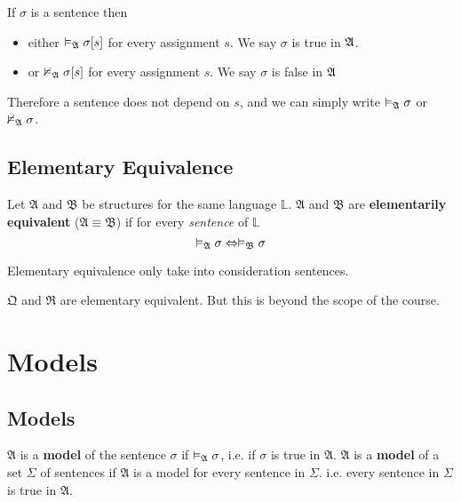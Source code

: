 \begin{corollary}
    If $\sigma$ is a sentence then
    \begin{itemize}
        \item either $\vDash_{\mathfrak{A}}\sigma[s]$ for every assignment $s$. We say $\sigma$ is true in $\mathfrak{A}$.
        \item or $\nvDash_{\mathfrak{A}}\sigma[s]$ for every assignment $s$. We say $\sigma$ is false in $\mathfrak{A}$
    \end{itemize}
\end{corollary}

Therefore a sentence does not depend on $s$, and we can simply write $\vDash_{\mathfrak{A}}\sigma$ or $\nvDash_{\mathfrak{A}}\sigma$.

\subsection{Elementary Equivalence}

\begin{definition}
    Let $\mathfrak{A}$ and $\mathfrak{B}$ be structures for the same language $\mathbb{L}$. $\mathfrak{A}$ and $\mathfrak{B}$ are \textbf{elementarily equivalent} ($\mathfrak{A} \equiv \mathfrak{B}$) if for every \emph{sentence} of $\mathbb{L}$
    \[ \vDash_{\mathfrak{A}}\sigma \Leftrightarrow \vDash_{\mathfrak{B}}\sigma \]
\end{definition}

\begin{remark}
    Elementary equivalence only take into consideration sentences.
\end{remark}

\begin{proposition}
    $\mathfrak{Q}$ and $\mathfrak{R}$ are elementary equivalent. But this is beyond the scope of the course.
\end{proposition}

\section{Models}

\subsection{Models}

\begin{definition}[Model]
    $\mathfrak{A}$ is a \textbf{model} of the sentence $\sigma$ if $\vDash_{\mathfrak{A}}\sigma$, i.e. if $\sigma$ is true in $\mathfrak{A}$. $\mathfrak{A}$ is a \textbf{model} of a set $\Sigma$ of sentences if $\mathfrak{A}$ is a model for every sentence in $\Sigma$. i.e. every sentence in $\Sigma$ is true in $\mathfrak{A}$.
\end{definition}


